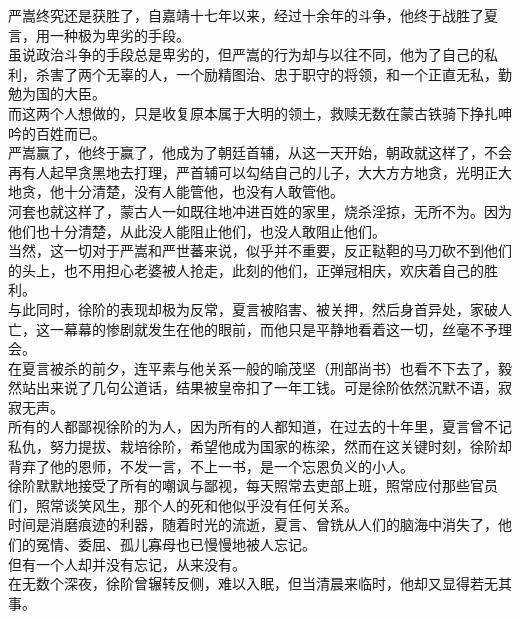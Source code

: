 \begin{multicols}{\theparacolNo}
严嵩终究还是获胜了，自嘉靖十七年以来，经过十余年的斗争，他终于战胜了夏言，用一种极为卑劣的手段。\\

虽说政治斗争的手段总是卑劣的，但严嵩的行为却与以往不同，他为了自己的私利，杀害了两个无辜的人，一个励精图治、忠于职守的将领，和一个正直无私，勤勉为国的大臣。\\

而这两个人想做的，只是收复原本属于大明的领土，救赎无数在蒙古铁骑下挣扎呻吟的百姓而已。\\

严嵩赢了，他终于赢了，他成为了朝廷首辅，从这一天开始，朝政就这样了，不会再有人起早贪黑地去打理，严首辅可以勾结自己的儿子，大大方方地贪，光明正大地贪，他十分清楚，没有人能管他，也没有人敢管他。\\

河套也就这样了，蒙古人一如既往地冲进百姓的家里，烧杀淫掠，无所不为。因为他们也十分清楚，从此没人能阻止他们，也没人敢阻止他们。\\

当然，这一切对于严嵩和严世蕃来说，似乎并不重要，反正鞑靼的马刀砍不到他们的头上，也不用担心老婆被人抢走，此刻的他们，正弹冠相庆，欢庆着自己的胜利。\\

与此同时，徐阶的表现却极为反常，夏言被陷害、被关押，然后身首异处，家破人亡，这一幕幕的惨剧就发生在他的眼前，而他只是平静地看着这一切，丝毫不予理会。\\

在夏言被杀的前夕，连平素与他关系一般的喻茂坚（刑部尚书）也看不下去了，毅然站出来说了几句公道话，结果被皇帝扣了一年工钱。可是徐阶依然沉默不语，寂寂无声。\\

所有的人都鄙视徐阶的为人，因为所有的人都知道，在过去的十年里，夏言曾不记私仇，努力提拔、栽培徐阶，希望他成为国家的栋梁，然而在这关键时刻，徐阶却背弃了他的恩师，不发一言，不上一书，是一个忘恩负义的小人。\\

徐阶默默地接受了所有的嘲讽与鄙视，每天照常去吏部上班，照常应付那些官员们，照常谈笑风生，那个人的死和他似乎没有任何关系。\\

时间是消磨痕迹的利器，随着时光的流逝，夏言、曾铣从人们的脑海中消失了，他们的冤情、委屈、孤儿寡母也已慢慢地被人忘记。\\

但有一个人却并没有忘记，从来没有。\\

在无数个深夜，徐阶曾辗转反侧，难以入眠，但当清晨来临时，他却又显得若无其事。\\


\end{multicols}
